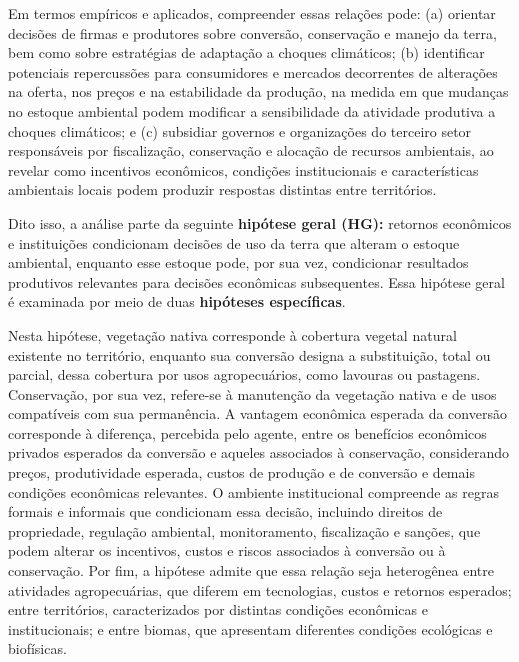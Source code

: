 Em termos empíricos e aplicados, compreender essas relações pode: (a) orientar decisões de firmas e produtores sobre conversão, conservação e manejo da terra, bem como sobre estratégias de adaptação a choques climáticos; (b) identificar potenciais repercussões para consumidores e mercados decorrentes de alterações na oferta, nos preços e na estabilidade da produção, na medida em que mudanças no estoque ambiental podem modificar a sensibilidade da atividade produtiva a choques climáticos; e (c) subsidiar governos e organizações do terceiro setor responsáveis por fiscalização, conservação e alocação de recursos ambientais, ao revelar como incentivos econômicos, condições institucionais e características ambientais locais podem produzir respostas distintas entre territórios.


Dito isso, a análise parte da seguinte \textbf{hipótese geral (HG):} retornos econômicos e instituições condicionam decisões de uso da terra que alteram o estoque ambiental, enquanto esse estoque pode, por sua vez, condicionar resultados produtivos relevantes para decisões econômicas subsequentes. Essa hipótese geral é examinada por meio de duas \textbf{hipóteses específicas}.

\medskip



\medskip

Nesta hipótese, vegetação nativa corresponde à cobertura vegetal natural existente no território, enquanto sua conversão designa a substituição, total ou parcial, dessa cobertura por usos agropecuários, como lavouras ou pastagens. Conservação, por sua vez, refere-se à manutenção da vegetação nativa e de usos compatíveis com sua permanência. A vantagem econômica esperada da conversão corresponde à diferença, percebida pelo agente, entre os benefícios econômicos privados esperados da conversão e aqueles associados à conservação, considerando preços, produtividade esperada, custos de produção e de conversão e demais condições econômicas relevantes. O ambiente institucional compreende as regras formais e informais que condicionam essa decisão, incluindo direitos de propriedade, regulação ambiental, monitoramento, fiscalização e sanções, que podem alterar os incentivos, custos e riscos associados à conversão ou à conservação. Por fim, a hipótese admite que essa relação seja heterogênea entre atividades agropecuárias, que diferem em tecnologias, custos e retornos esperados; entre territórios, caracterizados por distintas condições econômicas e institucionais; e entre biomas, que apresentam diferentes condições ecológicas e biofísicas.

